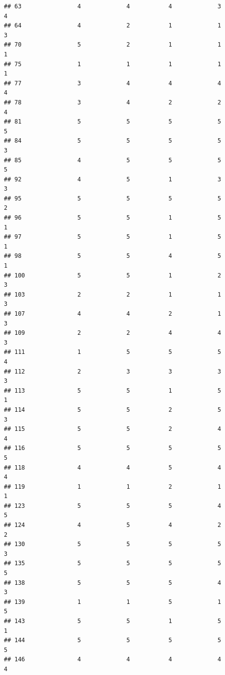 \documentclass[
]{article}
\begin{document}
\begin{verbatim}
## 63                4             4           4             3            4
## 64                4             2           1             1            3
## 70                5             2           1             1            1
## 75                1             1           1             1            1
## 77                3             4           4             4            4
## 78                3             4           2             2            4
## 81                5             5           5             5            5
## 84                5             5           5             5            3
## 85                4             5           5             5            5
## 92                4             5           1             3            3
## 95                5             5           5             5            2
## 96                5             5           1             5            1
## 97                5             5           1             5            1
## 98                5             5           4             5            1
## 100               5             5           1             2            3
## 103               2             2           1             1            3
## 107               4             4           2             1            3
## 109               2             2           4             4            3
## 111               1             5           5             5            4
## 112               2             3           3             3            3
## 113               5             5           1             5            1
## 114               5             5           2             5            3
## 115               5             5           2             4            4
## 116               5             5           5             5            5
## 118               4             4           5             4            4
## 119               1             1           2             1            1
## 123               5             5           5             4            5
## 124               4             5           4             2            2
## 130               5             5           5             5            3
## 135               5             5           5             5            5
## 138               5             5           5             4            3
## 139               1             1           5             1            5
## 143               5             5           1             5            1
## 144               5             5           5             5            5
## 146               4             4           4             4            4

\end{verbatim}
\end{document}
